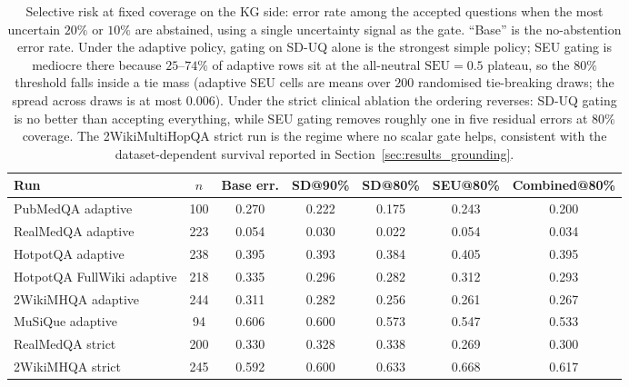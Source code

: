 \begin{table}[t]
\centering
\small
\caption{Selective risk at fixed coverage on the KG side: error rate among
the accepted questions when the most uncertain $20\%$ or $10\%$ are
abstained, using a single uncertainty signal as the gate.
``Base'' is the no-abstention error rate.
Under the adaptive policy, gating on SD-UQ alone is the strongest simple
policy; SEU gating is mediocre there because $25$--$74\%$ of adaptive rows
sit at the all-neutral $\mathrm{SEU}=0.5$ plateau, so the $80\%$ threshold
falls inside a tie mass (adaptive SEU cells are means over $200$ randomised
tie-breaking draws; the spread across draws is at most $0.006$).
Under the strict clinical ablation the ordering reverses: SD-UQ gating is no
better than accepting everything, while SEU gating removes roughly one in
five residual errors at $80\%$ coverage.
The 2WikiMultiHopQA strict run is the regime where no scalar gate helps,
consistent with the dataset-dependent survival reported in
Section~\ref{sec:results_grounding}.
\label{tab:operating_points}}
\setlength{\tabcolsep}{4pt}
\begin{tabular}{@{}lcccccc@{}}
\toprule
Run & $n$ & Base err. & SD@90\% & SD@80\% & SEU@80\% & Combined@80\% \\
\midrule
PubMedQA adaptive & 100 & 0.270 & 0.222 & 0.175 & 0.243 & 0.200 \\
RealMedQA adaptive & 223 & 0.054 & 0.030 & 0.022 & 0.054 & 0.034 \\
HotpotQA adaptive & 238 & 0.395 & 0.393 & 0.384 & 0.405 & 0.395 \\
HotpotQA FullWiki adaptive & 218 & 0.335 & 0.296 & 0.282 & 0.312 & 0.293 \\
2WikiMHQA adaptive & 244 & 0.311 & 0.282 & 0.256 & 0.261 & 0.267 \\
MuSiQue adaptive & 94 & 0.606 & 0.600 & 0.573 & 0.547 & 0.533 \\
\midrule
RealMedQA strict & 200 & 0.330 & 0.328 & 0.338 & 0.269 & 0.300 \\
2WikiMHQA strict & 245 & 0.592 & 0.600 & 0.633 & 0.668 & 0.617 \\
\bottomrule
\end{tabular}
\end{table}

